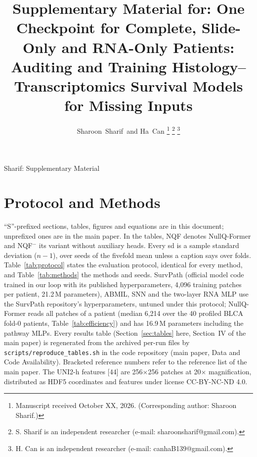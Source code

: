 \documentclass[9pt,journal]{IEEEtran}
\newcommand{\pq}{NullQ-Former}
\newcommand{\pqf}{NQF}
\newcommand{\pqm}{NQF$^{-}$}
\begin{document}
\title{Supplementary Material for: One Checkpoint for Complete, Slide-Only and RNA-Only Patients: Auditing and Training Histology--Transcriptomics Survival Models for Missing Inputs}

\author{Sharoon~Sharif\, and Ha~Can%
\thanks{Manuscript received October XX, 2026. (Corresponding author: Sharoon Sharif.)}%
\thanks{S. Sharif is an independent researcher (e-mail: sharoonsharif@gmail.com).}%
\thanks{H. Can is an independent researcher (e-mail: canhaB139@gmail.com).}}

%
{Sharif: Supplementary Material}

\maketitle

\section{Protocol and Methods}
\label{sec:protocol}
``S''-prefixed sections, tables, figures and equations are in this document; unprefixed ones are in the main paper. In the tables, \pqf{} denotes \pq{} and \pqm{} its variant without auxiliary heads. Every sd is a sample standard deviation ($n-1$), over seeds of the fivefold mean unless a caption says over folds. Table~\ref{tab:protocol} states the evaluation protocol, identical for every method, and Table~\ref{tab:methods} the methods and seeds. SurvPath (official model code trained in our loop with its published hyperparameters, 4,096 training patches per patient, 21.2\,M parameters), ABMIL, SNN and the two-layer RNA MLP use the SurvPath repository's hyperparameters, untuned under this protocol; \pq{} reads all patches of a patient (median 6,214 over the 40 profiled BLCA fold-0 patients, Table~\ref{tab:efficiency}) and has 16.9\,M parameters including the pathway MLPs. Every results table (Section~\ref{sec:tables} here, Section~IV of the main paper) is regenerated from the archived per-run files by \texttt{scripts/reproduce\_tables.sh} in the code repository (main paper, Data and Code Availability). Bracketed reference numbers refer to the reference list of the main paper. The UNI2-h features [44] are 256$\times$256 patches at 20$\times$ magnification, distributed as HDF5 coordinates and features under license CC-BY-NC-ND 4.0.
\end{document}
